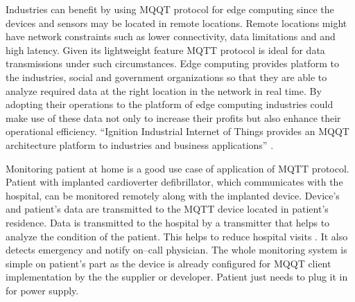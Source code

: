 \documentclass[sigconf]{acmart}
\begin{document}
Industries can benefit by using MQQT protocol for edge computing since the devices and sensors may be located in remote locations. Remote locations might have network constraints such as lower connectivity, data limitations and and high latency. Given its lightweight feature MQTT protocol is ideal for data transmissions under such circumstances. Edge computing provides platform to the industries, social and government organizations so that they are able to analyze required data at the right location in the network in real time. By adopting their operations to the platform of edge computing industries could make use of these data not only to increase their profits but also enhance their operational efficiency. ``Ignition Industrial Internet of Things provides an MQQT architecture platform to industries and business applications'' \cite{inductiveautomation-com}. 

Monitoring patient at home is a good use case of application of MQTT protocol. Patient with implanted cardioverter defibrillator, which communicates with the hospital, can be monitored remotely along with the implanted device. Device's and patient's data are transmitted to the MQTT device located in patient's residence. Data is transmitted to the hospital by a transmitter that helps to analyze the condition of the patient. This helps to reduce hospital visits \cite{www-ibm-com/support}. It also detects emergency and notify on--call physician. The whole monitoring system is simple on patient's part as the device is already configured for MQQT client implementation by the the supplier or developer. Patient just needs to plug it in for power supply.
\end{document}
